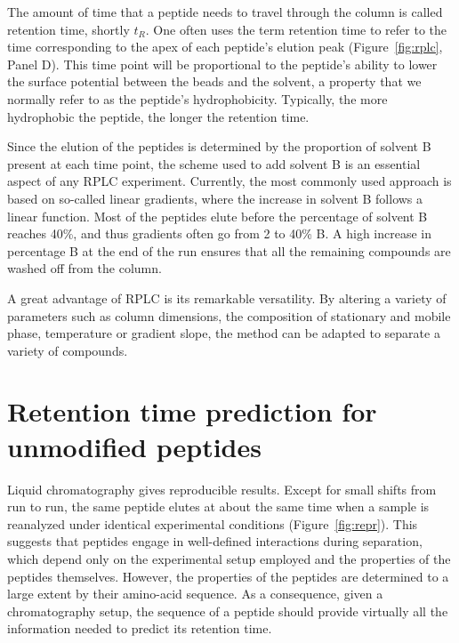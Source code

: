\documentclass[a4paper]{article}
\begin{document}
The amount of time that a peptide needs to travel through the column
is called retention time, shortly $t_R$. One often uses the term
retention time to refer to the time corresponding to the apex of each
peptide's elution peak (Figure~\ref{fig:rplc}, Panel D). This time
point will be proportional to the peptide's ability to lower the
surface potential between the beads and the solvent, a property that
we normally refer to as the peptide's hydrophobicity.  Typically, the
more hydrophobic the peptide, the longer the retention time.

Since the elution of the peptides is determined by the proportion of
solvent B present at each time point, the scheme used to add solvent B
is an essential aspect of any RPLC experiment. Currently, the most
commonly used approach is based on so-called linear gradients, where
the increase in solvent B follows a linear function. Most of the
peptides elute before the percentage of solvent B reaches 40\%, and
thus gradients often go from 2 to 40\% B. A high increase in
percentage B at the end of the run ensures that all the remaining
compounds are washed off from the column.

A great advantage of RPLC is its remarkable versatility. By altering a
variety of parameters such as column dimensions, the composition of
stationary and mobile phase, temperature or gradient slope, the method
can be adapted to separate a variety of compounds.

\section{\label{sec:rtpred}Retention time prediction for unmodified peptides}

Liquid chromatography gives reproducible results. Except for small
shifts from run to run, the same peptide elutes at about the same time
when a sample is reanalyzed under identical experimental conditions
(Figure~\ref{fig:repr}). This suggests that peptides engage in
well-defined interactions during separation, which depend only on the
experimental setup employed and the properties of the peptides
themselves. However, the properties of the peptides are determined to
a large extent by their amino-acid sequence. As a consequence, given a
chromatography setup, the sequence of a peptide should provide
virtually all the information needed to predict its retention time.
\end{document}
